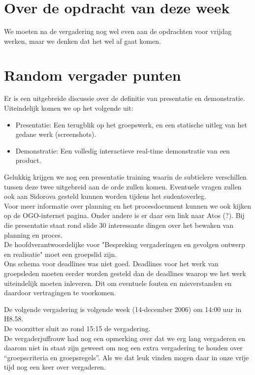 \documentclass[]{article}
\begin{document}
\section{Over de opdracht van deze week}
We moeten na de vergadering nog wel even aan de opdrachten voor vrijdag werken,
maar we denken dat het wel af gaat komen.\\
\section{Random vergader punten}
Er is een uitgebreide discussie over de definitie van presentatie en
demonstratie. Uiteindelijk komen we op het volgende uit:\\
\begin{itemize}
\item Presentatie: Een terugblik op het groepswerk, en een statische uitleg van
het gedane werk (screenshots).
\item Demonstratie: Een volledig interactieve real-time demonstratie van
een product.
\end{itemize}
Gelukkig krijgen we nog een presentatie training waarin de subtielere
verschillen tussen deze twee uitgebreid aan de orde zullen komen. %
Eventuele vragen zullen ook aan Sidorova gesteld kunnen worden tijdens het
sudentoverleg.\\
Voor meer informatie over planning en het procesdocument kunnen we ook kijken op
de OGO-internet pagina. Onder andere is er daar een link naar Atos (?). Bij die
presentatie staat rond slide 30 interessante dingen over het bewaken van
planning en proces.\\
De hoofdverantwoordelijke voor "Bespreking vergaderingen en gevolgen ontwerp en
realisatie" moet een groepslid zijn.\\
Ons schema voor deadlines was niet goed. Deadlines voor het werk van groepsleden
moeten eerder worden gesteld dan de deadlines waarop we het werk uiteindelijk
moeten inleveren. Dit om eventuele fouten en misverstanden en daardoor
vertragingen te voorkomen. 

De volgende vergadering is volgende week (14-december 2006) om 14:00 uur in
H8.58.\\
De voorzitter sluit zo rond 15:15 de vergadering.\\

De vergaderjuffrouw had nog een opmerking over dat we erg lang vergaderen en
daarom niet in staat zijn geweest om nog een extra vergadering te houden over
``groepscriteria en groepsregels''. Als we dat leuk vinden mogen daar in onze
vrije tijd nog een keer over vergaderen.
\end{document}
